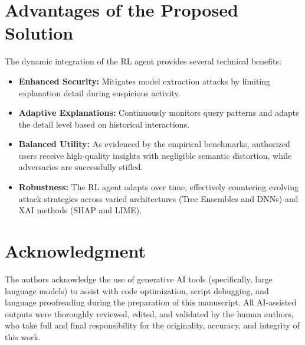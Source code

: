 \documentclass[conference]{IEEEtran}
\begin{document}
\section{Advantages of the Proposed Solution}
The dynamic integration of the RL agent provides several technical benefits:
\begin{itemize}
    \item \textbf{Enhanced Security:} Mitigates model extraction attacks by limiting explanation detail during suspicious activity.
    \item \textbf{Adaptive Explanations:} Continuously monitors query patterns and adapts the detail level based on historical interactions.
    \item \textbf{Balanced Utility:} As evidenced by the empirical benchmarks, authorized users receive high-quality insights with negligible semantic distortion, while adversaries are successfully stifled.
    \item \textbf{Robustness:} The RL agent adapts over time, effectively countering evolving attack strategies across varied architectures (Tree Ensembles and DNNs) and XAI methods (SHAP and LIME).
\end{itemize}

\section*{Acknowledgment}
The authors acknowledge the use of generative AI tools (specifically, large language models) to assist with code optimization, script debugging, and language proofreading during the preparation of this manuscript. All AI-assisted outputs were thoroughly reviewed, edited, and validated by the human authors, who take full and final responsibility for the originality, accuracy, and integrity of this work.






\end{document}
